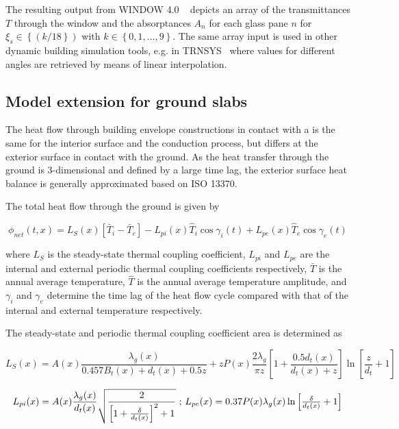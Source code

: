 The resulting output from WINDOW 4.0 ~\cite{Lawrence1993} depicts an array of the transmittances $T$ through the window and the absorptances $A_{n}$ for each glass pane $n$ for $\xi_s\in\left\{\left(k/18\right\}\right)$ with $k\in\left\{0,1,\ldots,9\right\}$. The same array input is used in other dynamic building simulation tools, e.g. in TRNSYS~\cite{Solar2009} where values for different angles are retrieved by means of linear interpolation. 

\subsection{Model extension for ground slabs}

The heat flow through building envelope constructions in contact with a  is the same for the interior surface and the  conduction process, but differs at the exterior surface in contact with the ground. As the heat transfer through the ground is 3-dimensional and defined by a large time lag, the exterior surface heat balance is generally approximated based on ISO 13370.

The total heat flow through the ground is given by

\begin{dmath}
\phi_{net}(t,x) = L_{S}(x) \left[ \bar{T}_{i} - \bar{T}_{e} \right] - L_{pi}(x) \hat{T}_{i} \cos \gamma_{i}(t) + L_{pe}(x) \hat{T}_{e} \cos \gamma_{e}(t)
\end{dmath}

where $L_{S}$ is the steady-state thermal coupling coefficient, $L_{pi}$ and $L_{pe}$ are the internal and external periodic thermal coupling coefficients respectively, $\bar{T}$ is the annual average temperature, $\hat{T}$ is the annual average temperature amplitude, and $\gamma_{i}$ and $\gamma_{e}$ determine the time lag of the heat flow cycle compared with that of the internal and external temperature respectively.

The steady-state and periodic thermal coupling coefficient area is determined as 

\begin{dmath}
L_{S}(x) = A(x) \frac{\lambda_{g}(x)}{0.457 B_{t}(x) + d_{t}(x) + 0.5 z} + z P(x) \frac{2 \lambda_{g}}{\pi z} \left[1+\frac{0.5 d_{t}(x)}{d_{t}(x)+z}\right] \ln \left[\frac{z}{d_{t}}+1\right] 
\end{dmath}

\begin{dmath}
L_{pi}(x) = A(x) \frac{\lambda_{g}(x)}{d_{t}(x)} \sqrt{\frac{2}{\left[ 1 + \frac{\delta}{d_{t}(x)}\right]^{2} +1}} $ ; $ L_{pe}(x) = 0.37 P(x) \lambda_{g}(x) \ln{\left[\frac{\delta}{d_{t}(x)} + 1\right]}
\end{dmath}

